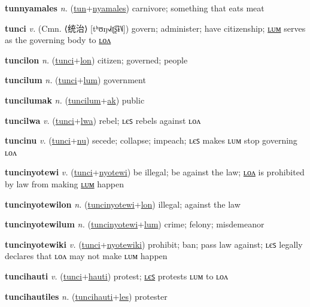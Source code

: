 \textbf{\hypertarget{tunnyamales}{tunnyamales}} \textit{n.} (\hyperlink{tun}{tun}+\allowbreak \hyperlink{nyamales}{nyamales})
carnivore; something that eats meat

\textbf{\hypertarget{tunci}{tunci}} \textit{v.} (Cmn. ⟨{\chinese{}统治}⟩ [tʰʊŋ˧˩˧ʈ͡ʂɨ˥˩])
govern; administer; have citizenship; \hyperlink{tuncilum}{ʟᴜᴍ} serves as the governing body to \hyperlink{tuncilon}{ʟᴏᴧ}

\textbf{\hypertarget{tuncilon}{tuncilon}} \textit{n.} (\hyperlink{tunci}{tunci}+\allowbreak \hyperlink{lon}{lon})
citizen; governed; people

\textbf{\hypertarget{tuncilum}{tuncilum}} \textit{n.} (\hyperlink{tunci}{tunci}+\allowbreak \hyperlink{lum}{lum})
government

\textbf{\hypertarget{tuncilumak}{tuncilumak}} \textit{n.} (\hyperlink{tuncilum}{tuncilum}+\allowbreak \hyperlink{ak}{ak})
public

\textbf{\hypertarget{tuncilwa}{tuncilwa}} \textit{v.} (\hyperlink{tunci}{tunci}+\allowbreak \hyperlink{lwa}{lwa})
rebel; ʟєꜱ rebels against ʟᴏᴧ

\textbf{\hypertarget{tuncinu}{tuncinu}} \textit{v.} (\hyperlink{tunci}{tunci}+\allowbreak \hyperlink{nu}{nu})
secede; collapse; impeach; ʟєꜱ makes ʟᴜᴍ stop governing ʟᴏᴧ

\textbf{\hypertarget{tuncinyotewi}{tuncinyotewi}} \textit{v.} (\hyperlink{tunci}{tunci}+\allowbreak \hyperlink{nyotewi}{nyotewi})
be illegal; be against the law; \hyperlink{tuncinyotewilon}{ʟᴏᴧ} is prohibited by law from making \hyperlink{tuncinyotewilum}{ʟᴜᴍ} happen

\textbf{\hypertarget{tuncinyotewilon}{tuncinyotewilon}} \textit{n.} (\hyperlink{tuncinyotewi}{tuncinyotewi}+\allowbreak \hyperlink{lon}{lon})
illegal; against the law

\textbf{\hypertarget{tuncinyotewilum}{tuncinyotewilum}} \textit{n.} (\hyperlink{tuncinyotewi}{tuncinyotewi}+\allowbreak \hyperlink{lum}{lum})
crime; felony; misdemeanor

\textbf{\hypertarget{tuncinyotewiki}{tuncinyotewiki}} \textit{v.} (\hyperlink{tunci}{tunci}+\allowbreak \hyperlink{nyotewiki}{nyotewiki})
prohibit; ban; pass law against; ʟєꜱ legally declares that ʟᴏᴧ may not make ʟᴜᴍ happen

\textbf{\hypertarget{tuncihauti}{tuncihauti}} \textit{v.} (\hyperlink{tunci}{tunci}+\allowbreak \hyperlink{hauti}{hauti})
protest; \hyperlink{tuncihautiles}{ʟєꜱ} protests ʟᴜᴍ to ʟᴏᴧ

\textbf{\hypertarget{tuncihautiles}{tuncihautiles}} \textit{n.} (\hyperlink{tuncihauti}{tuncihauti}+\allowbreak \hyperlink{les}{les})
protester

